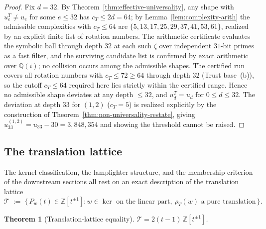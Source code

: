 \documentclass[11pt]{article}
\theoremstyle{plain}
\newtheorem{theorem}{Theorem}
\theoremstyle{definition}
\theoremstyle{remark}
\begin{document}
\begin{proof}
Fix $d = 32$. By Theorem~\ref{thm:effective-universality}, any shape
with $u_e^T \ne u_e$ for some $e \le 32$ has $c_T \le 2d = 64$; by
Lemma~\ref{lem:complexity-arith} the admissible complexities with
$c_T \le 64$ are $\{5, 13, 17, 25, 29, 37, 41, 53, 61\}$, realized by an
explicit finite list of rotation numbers. The arithmetic certificate
evaluates the symbolic ball through depth $32$ at each such $\zeta$
over independent $31$-bit primes as a fast filter, and the surviving
candidate list is confirmed by exact arithmetic over $\mathbb{Q}(i)$;
no collision occurs among the admissible shapes. The certified run
covers all rotation numbers with $c_T \le 72 \ge 64$ through depth $32$
(Trust base~(b)), so the cutoff $c_T \le 64$ required here lies strictly
within the certified range. Hence no admissible shape deviates at any
depth $\le 32$, and $u_d^T = u_d$ for $0 \le d \le 32$. The deviation at
depth $33$ for $(1,2)$ ($c_T = 5$) is realized explicitly by the
construction of Theorem~\ref{thm:non-universality-restate}, giving
$u_{33}^{(1,2)} = u_{33} - 30 = 3{,}848{,}354$ and showing the
threshold cannot be raised.
\end{proof}

\subsection{The translation lattice}

The kernel classification, the lamplighter structure, and the
membership criterion of the downstream sections all rest on an exact
description of the translation lattice
\[
\mathcal{T} \;:=\; \{\, P_w(t) \in \mathbb{Z}[t^{\pm 1}] :
w \in \ker \text{ on the linear part},\ \rho_T(w) \text{ a pure
translation} \,\}.
\]

\begin{theorem}[Translation-lattice equality]
\label{thm:translation-lattice}
$\mathcal{T} = 2(t-1)\,\mathbb{Z}[t^{\pm 1}]$.
\end{theorem}
\end{document}
